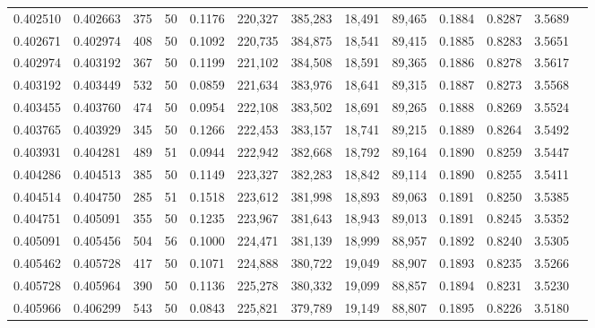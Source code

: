 \begin{tabular}{rrrrrrrrrrrrr}
0.402510 & 0.402663 &   375 &  50 &                                     0.1176 & 220,327 & 385,283 &  18,491 &  89,465 & 0.1884 & 0.8287 & 3.5689 \\
0.402671 & 0.402974 &   408 &  50 &                                     0.1092 & 220,735 & 384,875 &  18,541 &  89,415 & 0.1885 & 0.8283 & 3.5651 \\
0.402974 & 0.403192 &   367 &  50 &                                     0.1199 & 221,102 & 384,508 &  18,591 &  89,365 & 0.1886 & 0.8278 & 3.5617 \\
0.403192 & 0.403449 &   532 &  50 &                                     0.0859 & 221,634 & 383,976 &  18,641 &  89,315 & 0.1887 & 0.8273 & 3.5568 \\
0.403455 & 0.403760 &   474 &  50 &                                     0.0954 & 222,108 & 383,502 &  18,691 &  89,265 & 0.1888 & 0.8269 & 3.5524 \\
0.403765 & 0.403929 &   345 &  50 &                                     0.1266 & 222,453 & 383,157 &  18,741 &  89,215 & 0.1889 & 0.8264 & 3.5492 \\
0.403931 & 0.404281 &   489 &  51 &                                     0.0944 & 222,942 & 382,668 &  18,792 &  89,164 & 0.1890 & 0.8259 & 3.5447 \\
0.404286 & 0.404513 &   385 &  50 &                                     0.1149 & 223,327 & 382,283 &  18,842 &  89,114 & 0.1890 & 0.8255 & 3.5411 \\
0.404514 & 0.404750 &   285 &  51 &                                     0.1518 & 223,612 & 381,998 &  18,893 &  89,063 & 0.1891 & 0.8250 & 3.5385 \\
0.404751 & 0.405091 &   355 &  50 &                                     0.1235 & 223,967 & 381,643 &  18,943 &  89,013 & 0.1891 & 0.8245 & 3.5352 \\
0.405091 & 0.405456 &   504 &  56 &                                     0.1000 & 224,471 & 381,139 &  18,999 &  88,957 & 0.1892 & 0.8240 & 3.5305 \\
0.405462 & 0.405728 &   417 &  50 &                                     0.1071 & 224,888 & 380,722 &  19,049 &  88,907 & 0.1893 & 0.8235 & 3.5266 \\
0.405728 & 0.405964 &   390 &  50 &                                     0.1136 & 225,278 & 380,332 &  19,099 &  88,857 & 0.1894 & 0.8231 & 3.5230 \\
0.405966 & 0.406299 &   543 &  50 &                                     0.0843 & 225,821 & 379,789 &  19,149 &  88,807 & 0.1895 & 0.8226 & 3.5180 \\

\end{tabular}
